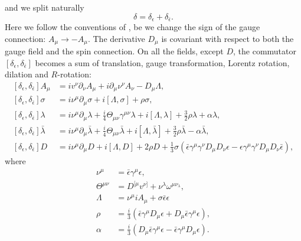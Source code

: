 and we split naturally
\begin{equation}
\delta = \delta_\epsilon + \delta_{\bar\epsilon}.
\end{equation}
Here we follow the conventions of \cite{Hama11}, be we change the sign of the gauge
connection: $A_\mu\rightarrow - A_\mu$. The derivative $D_\mu$ is covariant
with respect to both the gauge field and the spin connection. On all the
fields, except $D$, the commutator
$\left[\delta_{\epsilon},\delta_{\bar{\epsilon}}\right]$ becomes a sum
of translation, gauge transformation, Lorentz rotation, dilation and
$R$-rotation:
\begin{align}
  \left[\delta_\epsilon, \delta_{\bar{\epsilon}}\right]A_\mu
  &= iv^\nu\partial_\nu A_\mu + i\partial_\mu\nu^\nu A_\nu
  - D_\mu\Lambda,\nonumber\\
  \left[\delta_\epsilon, \delta_{\bar{\epsilon}}\right]\sigma
  &= i\nu^\mu\partial_\mu\sigma + i\left[\Lambda, \sigma\right] + \rho\sigma,
  \nonumber\\
  \left[\delta_\epsilon, \delta_{\bar{\epsilon}}\right]\lambda
  &= i\nu^\mu\partial_\mu\lambda
  + \frac{i}{4}\Theta_{\mu\nu}\gamma^{\mu\nu}\lambda + i\left[\Lambda,
  \lambda\right] + \frac{3}{2}\rho\lambda + \alpha\lambda,\nonumber\\
  \left[\delta_\epsilon, \delta_{\bar{\epsilon}}\right]\bar{\lambda}
  &= i\nu^\mu \partial_\mu\bar{\lambda}
  + \frac{i}{4}\Theta_{\mu\nu}\bar{\lambda} + i\left[\Lambda,
  \bar{\lambda}\right] + \frac{3}{2}\rho\bar{\lambda}
  - \alpha\bar{\lambda},\nonumber\\
  \left[\delta_\epsilon, \delta_{\bar{\epsilon}}\right]D &=i\nu^\mu\partial_\mu
  D + i\left[\Lambda, D\right] + 2\rho
  D + \frac{1}{3}\sigma(\bar{\epsilon}\gamma^\mu\gamma^{\nu}D_\mu D_\nu\epsilon
  -\epsilon\gamma^\mu\gamma^\nu D_\mu D_\nu\bar{\epsilon}),
\end{align}
where
\begin{align}
  \nu^\mu &= \bar{\epsilon}\gamma^\mu\epsilon,\nonumber\\
  \Theta^{\mu\nu} &= D^{[\mu}v^{\nu]}
  + \nu^\lambda\omega^{\mu\nu_\lambda},\nonumber\\
  \Lambda &= \nu^\mu i A_\mu + \sigma\bar{\epsilon}\epsilon\nonumber\\
  \rho &= \frac{i}{3}(\bar{\epsilon}\gamma^{\mu}D_\mu\epsilon + D_\mu
  \bar{\epsilon}\gamma^\mu\epsilon),\nonumber\\
  \alpha &= \frac{i}{3}(D_\mu\bar{\epsilon}\gamma^{\mu}\epsilon
  - \bar{\epsilon}\gamma^\mu D_\mu\epsilon).
\end{align}
